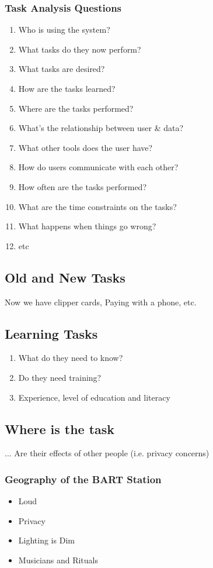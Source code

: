 \subsubsection{Task Analysis Questions}
\begin{enumerate}
    \item Who is using the system?
    \item What tasks do they now perform?
    \item What tasks are desired?
    \item How are the tasks learned?
    \item Where are the tasks performed?
    \item What's the relationship between user \& data? 
    \item What other tools does the user have?
    \item How do users communicate with each other? 
    \item How often are the tasks performed? 
    \item What are the time constraints on the tasks? 
    \item What happens when things go wrong?
    \item etc
\end{enumerate}

\subsection{Old and New Tasks}
Now we have clipper cards, Paying with a phone, etc.

\subsection{Learning Tasks}
\begin{enumerate}
    \item What do they need to know?
    \item Do they need training?
    \item Experience, level of education and literacy
\end{enumerate}

\subsection{Where is the task}
...
Are their effects of other people (i.e. privacy concerns)
\subsubsection{Geography of the BART Station}
\begin{itemize}
    \item Loud
    \item Privacy
    \item Lighting is Dim
    \item Musicians and Rituals
\end{itemize}

